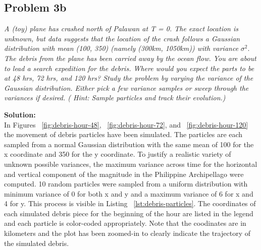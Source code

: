 \documentclass[11pt]{article}
\begin{document}
\subsection{Problem 3b}
\textit{A (toy) plane has crashed north of Palawan at T = 0. The exact location is unknown, but data suggests that the location of the crash follows a Gaussian distribution with mean (100, 350) (namely (300km, 1050km)) with variance}
    $\sigma^2$.
\textit{The debris from the plane has been carried away by the ocean flow. You are about to lead a search expedition for the debris. Where would you expect the parts to be at 48 hrs, 72 hrs, and 120 hrs? Study the problem by varying the variance of the Gaussian distribution. Either pick a few variance samples or sweep through the variances if desired. ( Hint: Sample particles and track their evolution.)}

\textbf{Solution:} \\

In Figures ~\ref{fig:debris-hour-48}, ~\ref{fig:debris-hour-72}, and ~\ref{fig:debris-hour-120} the movement of debris particles have been simulated. The particles are each sampled from a normal Gaussian distribution with the same mean of 100 for the x coordinate and 350 for the y coordinate. To justify a realistic variety of unknown possible variances, the maximum variance across time for the horizontal and vertical component of the magnitude in the Philippine Archipellago were computed. 10 random particles were sampled from a uniform distribution with minimum variance of 0 for both x and y and a maximum variance of 6 for x and 4 for y. This process is visible in Listing ~\ref{lst:debris-particles}. The coordinates of each simulated debris piece for the beginning of the hour are listed in the legend and each particle is color-coded appropriately. Note that the coodinates are in kilometers and the plot has been zoomed-in to clearly indicate the trajectory of the simulated debris.
\end{document}

